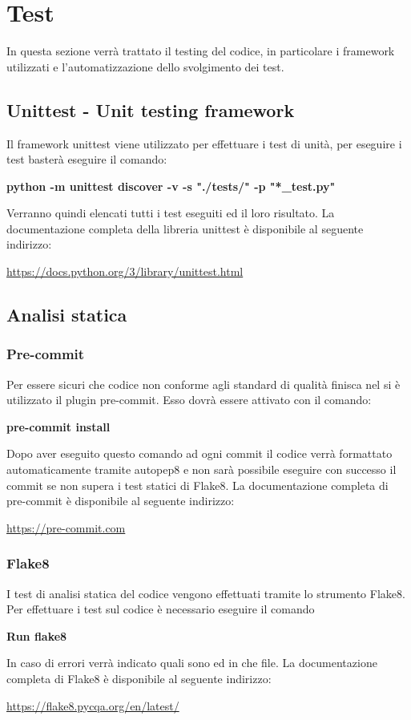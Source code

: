 \section{Test}

In questa sezione verrà trattato il testing del codice, in particolare i framework utilizzati e l'automatizzazione dello svolgimento dei test.

\subsection{Unittest - Unit testing framework}
\label{sec:unittest}
Il framework unittest viene utilizzato per effettuare i test di unità, per eseguire i test basterà eseguire il comando: \newline{}
\centerline{ \textbf{python -m unittest discover -v -s "./tests/" -p "*\_test.py"}}\newline{}
Verranno quindi elencati tutti i test eseguiti ed il loro risultato.
La documentazione completa della libreria unittest è disponibile al seguente indirizzo:
\newline{}\centerline{\url{https://docs.python.org/3/library/unittest.html}}

\subsection{Analisi statica}
\subsubsection{Pre-commit}
Per essere sicuri che codice non conforme agli standard di qualità finisca nel  si è utilizzato il plugin pre-commit. Esso dovrà essere attivato con il comando: \newline{}
\centerline{\textbf{pre-commit install}}\newline{}
Dopo aver eseguito questo comando ad ogni commit il codice verrà formattato automaticamente tramite autopep8 e non sarà possibile eseguire con successo il commit se non supera i test statici di Flake8.
La documentazione completa di pre-commit è disponibile al seguente indirizzo:
\newline{}\centerline{\url{https://pre-commit.com}}

\subsubsection{Flake8}
I test di analisi statica del codice vengono effettuati tramite lo strumento Flake8. Per effettuare i test sul codice è necessario eseguire il comando\newline{}
\centerline{\textbf{Run flake8}}\newline{}
In caso di errori verrà indicato quali sono ed in che file.
La documentazione completa di Flake8 è disponibile al seguente indirizzo:
\newline{}\centerline{\url{https://flake8.pycqa.org/en/latest/}}

